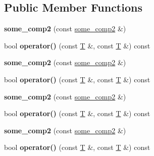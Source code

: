 \subsection*{Public Member Functions}
\begin{DoxyCompactItemize}
\item 
\mbox{\label{structsome__comp2_a2c0954b461c474a4e8db9e1118686006}} 
{\bfseries some\+\_\+comp2} (const \mbox{\hyperlink{structsome__comp2}{some\+\_\+comp2}} \&)
\item 
\mbox{\label{structsome__comp2_aea6067e7319c279ca4f6d8202b31eeb2}} 
bool {\bfseries operator()} (const \mbox{\hyperlink{struct_t}{T}} \&, const \mbox{\hyperlink{struct_t}{T}} \&) const
\item 
\mbox{\label{structsome__comp2_a2c0954b461c474a4e8db9e1118686006}} 
{\bfseries some\+\_\+comp2} (const \mbox{\hyperlink{structsome__comp2}{some\+\_\+comp2}} \&)
\item 
\mbox{\label{structsome__comp2_aea6067e7319c279ca4f6d8202b31eeb2}} 
bool {\bfseries operator()} (const \mbox{\hyperlink{struct_t}{T}} \&, const \mbox{\hyperlink{struct_t}{T}} \&) const
\item 
\mbox{\label{structsome__comp2_a2c0954b461c474a4e8db9e1118686006}} 
{\bfseries some\+\_\+comp2} (const \mbox{\hyperlink{structsome__comp2}{some\+\_\+comp2}} \&)
\item 
\mbox{\label{structsome__comp2_aea6067e7319c279ca4f6d8202b31eeb2}} 
bool {\bfseries operator()} (const \mbox{\hyperlink{struct_t}{T}} \&, const \mbox{\hyperlink{struct_t}{T}} \&) const
\item 
\mbox{\label{structsome__comp2_a2c0954b461c474a4e8db9e1118686006}} 
{\bfseries some\+\_\+comp2} (const \mbox{\hyperlink{structsome__comp2}{some\+\_\+comp2}} \&)
\item 
\mbox{\label{structsome__comp2_aea6067e7319c279ca4f6d8202b31eeb2}} 
bool {\bfseries operator()} (const \mbox{\hyperlink{struct_t}{T}} \&, const \mbox{\hyperlink{struct_t}{T}} \&) const
\item 
\mbox{\label{structsome__comp2_a2c0954b461c474a4e8db9e1118686006}} 

\end{DoxyCompactItemize}
